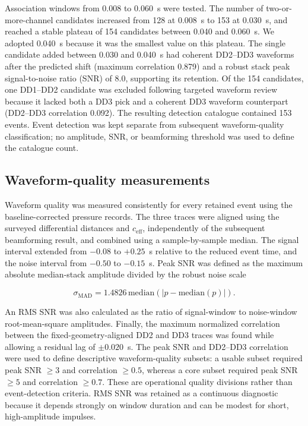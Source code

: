 Association windows from 0.008 to 0.060~s were tested.  The number of
two-or-more-channel candidates increased from 128 at 0.008~s to 153 at
0.030~s, and reached a stable plateau of 154 candidates between 0.040 and
0.060~s.  We adopted 0.040~s because it was the smallest value on this plateau.
The single candidate added between 0.030 and 0.040~s had coherent DD2--DD3
waveforms after the predicted shift (maximum correlation 0.879) and a robust
stack peak signal-to-noise ratio (SNR) of 8.0, supporting its retention.  Of
the 154 candidates, one DD1--DD2 candidate was excluded following targeted
waveform review because it lacked both a DD3 pick and a coherent DD3 waveform
counterpart (DD2--DD3 correlation 0.092).  The resulting detection catalogue
contained 153 events.  Event detection was kept separate from subsequent
waveform-quality classification; no amplitude, SNR, or beamforming threshold
was used to define the catalogue count.

\subsection{Waveform-quality measurements}
\label{sec:methods_waveform_quality}

Waveform quality was measured consistently for every retained event using the
baseline-corrected pressure records.  The three traces were aligned using the
surveyed differential distances and \(c_{\mathrm{eff}}\), independently of the
subsequent beamforming result, and combined using a sample-by-sample median.
The signal interval extended from \(-0.08\) to \(+0.25\)~s relative to the
reduced event time, and the noise interval from \(-0.50\) to \(-0.15\)~s.
Peak SNR was defined as the maximum absolute median-stack amplitude divided by
the robust noise scale

\begin{equation}
\sigma_{\mathrm{MAD}} = 1.4826\,
\mathrm{median}\left(\left|p-\mathrm{median}(p)\right|\right).
\end{equation}

An RMS SNR was also calculated as the ratio of signal-window to noise-window
root-mean-square amplitudes.  Finally, the maximum normalized correlation
between the fixed-geometry-aligned DD2 and DD3 traces was found while allowing
a residual lag of \(\pm0.020\)~s.  The peak SNR and DD2--DD3 correlation were
used to define descriptive waveform-quality subsets: a usable subset required
peak SNR \(\geq3\) and correlation \(\geq0.5\), whereas a core subset required
peak SNR \(\geq5\) and correlation \(\geq0.7\).  These are operational quality
divisions rather than event-detection criteria.  RMS SNR was retained as a
continuous diagnostic because it depends strongly on window duration and can
be modest for short, high-amplitude impulses.

